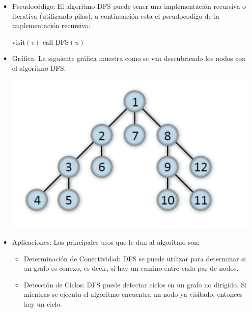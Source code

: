 \begin{itemize}
    \item Pseudocódigo: El algoritmo DFS puede tener una implementación recursiva o iterativa (utilizando pilas), a continuación esta el pseudocodigo de la implementación recursiva:

    \begin{center}
        \begin{algorithmic}[1]
        \State $\text{visit}(v)$
            \State $\text{call DFS}(u)$
        \EndIf
    \EndFor
\EndProcedure
        \end{algorithmic}
    \end{center}

    \item Gráfica: La siguiente gráfica muestra como se van descubriendo los nodos con el algoritmo DFS.

    \begin{center}
        \includegraphics[scale = 0.5]{IMA/ejemploDFS.png}
    \end{center}

    \item Aplicaciones: Los principales usos que le dan al algoritmo son:
    \begin{itemize}
        \item Determinación de Conectividad: DFS se puede utilizar para determinar si un grafo es conexo, es decir, si hay un camino entre cada par de nodos.

        \item Detección de Ciclos: DFS puede detectar ciclos en un grafo no dirigido. Si mientras se ejecuta el algoritmo encuentra un nodo ya visitado, entonces hay un ciclo.


\end{itemize}
\end{itemize}
